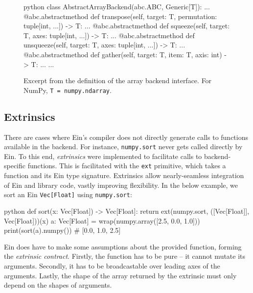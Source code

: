 \begin{figure}
    \centering
\begin{cminted}{python}
class AbstractArrayBackend(abc.ABC, Generic[T]):
    ...
    @abc.abstractmethod
    def transpose(self, target: T, permutation: tuple[int, ...]) -> T: ...
    @abc.abstractmethod
    def squeeze(self, target: T, axes: tuple[int, ...]) -> T: ...
    @abc.abstractmethod
    def unsqueeze(self, target: T, axes: tuple[int, ...]) -> T: ...
    @abc.abstractmethod
    def gather(self, target: T, item: T, axis: int) -> T: ...
    ...
\end{cminted}
    \caption{Excerpt from the definition of the array backend interface. For NumPy, \texttt{T = numpy.ndarray}.}
    \label{fig:abstract-array-methods}
\end{figure}

\subsection{Extrinsics}

There are cases where Ein's compiler does not directly generate calls to functions available in the backend. For instance, \texttt{numpy.sort} never gets called directly by Ein. To this end, \textit{extrinsics} were implemented to facilitate calls to backend-specific functions. This is facilitated with the \texttt{ext} primitive, which takes a function and its Ein type signature. Extrinsics allow nearly-seamless integration of Ein and library code, vastly improving flexibility. In the below example, we sort an Ein \texttt{Vec[Float]} using \texttt{numpy.sort}:
\begin{center}
\begin{cminted}{python}    
def sort(x: Vec[Float]) -> Vec[Float]:
    return ext(numpy.sort, ([Vec[Float]], Vec[Float]))(x)
a: Vec[Float] = wrap(numpy.array([2.5, 0.0, 1.0]))
print(sort(a).numpy())  # [0.0, 1.0, 2.5]
\end{cminted}
\end{center}

Ein does have to make some assumptions about the provided function, forming the \textit{extrinsic contract}. Firstly, the function has to be pure -- it cannot mutate its arguments. Secondly, it has to be broadcastable over leading axes of the arguments. Lastly, the shape of the array returned by the extrinsic must only depend on the shapes of arguments. 

